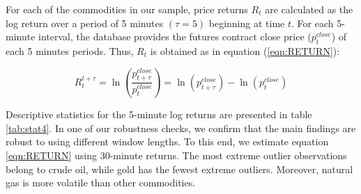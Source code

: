 
For each of the commodities in our sample, price returns $R_t$ are calculated as the log return over a period of 5 minutes $(\tau=5)$ beginning at time $t$. For each 5-minute interval, the database provides the futures contract close price ($p_{t}^{close}$) of each 5 minutes periods. Thus, $R_t$ is obtained  as in equation (\ref{eqn:RETURN}):

\begin{equation}\label{eqn:RETURN}
R_t^{t+\tau}=\ln \left( \frac{p_{t+\tau}^{close}}{p_{t}^{close}} \right)=\ln (p_{t+\tau}^{close})-\ln(p_{t}^{close})
\end{equation}

Descriptive statistics for the 5-minute log returns are presented in table \ref{tab:stat4}. In one of our robustness checks, we confirm that the main findings are robust to using different window lengths. To this end, we estimate equation \ref{eqn:RETURN}  using 30-minute returns.  The most extreme outlier observations belong to crude oil, while gold has the fewest extreme outliers. Moreover, natural gas is more volatile than other commodities. %


